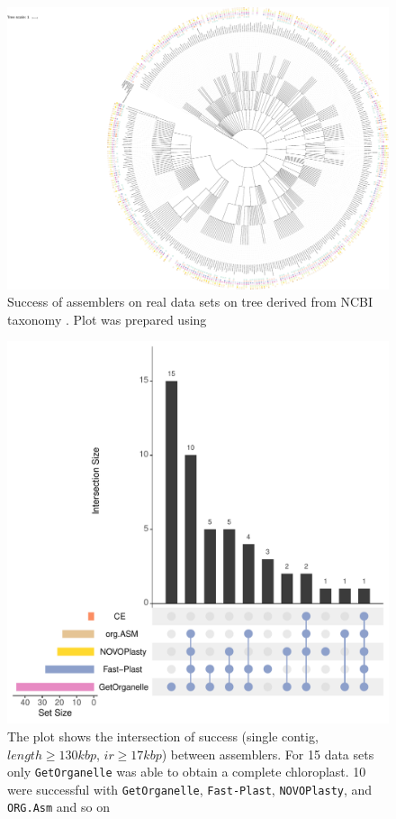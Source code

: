 \documentclass{bmcart}
\newcommand{\formatprogramnames}[1]{\texttt{#1}}
\newcommand{\oa}{\formatprogramnames{ORG.Asm}}
\newcommand{\fp}{\formatprogramnames{Fast-Plast}}
\newcommand{\np}{\formatprogramnames{NOVOPlasty}}
\newcommand{\go}{\formatprogramnames{GetOrganelle}}
\begin{document}
\begin{backmatter}
\begin{figure}[h!]
  \includegraphics[width=\textwidth]{plots/real_datasets_tree.pdf}
  \caption{ Success of assemblers on real data sets on tree derived from NCBI taxonomy \cite{ncbi2011}. Plot was prepared using \cite{Letunic2019}
       }
      \label{fig:tree}
      \end{figure}

\begin{figure}[h!]
  \includegraphics[width=\textwidth]{manuscript/plots/upset_novel.pdf}
  \caption{
      The plot shows the intersection of success (single contig, $length \ge 130kbp$, $ir \ge 17kbp$) between assemblers. For \num{15} data sets only \go{} was able to obtain a complete chloroplast. \num{10} were successful with \go{}, \fp{}, \np{}, and \oa{} and so on}
      \label{fig:upset_novel}
      \end{figure}


\end{backmatter}
\end{document}
